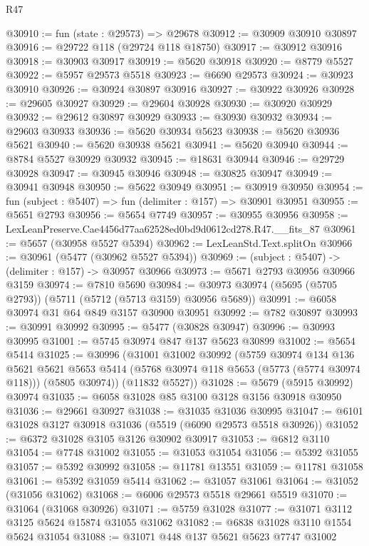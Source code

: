 \begin{lexlean}{R47}
\begin{coremodule}
@30910 := fun (state : @29573) => @29678
@30912 := @30909 @30910 @30897
@30916 := @29722 @118 (@29724 @118 @18750)
@30917 := @30912 @30916
@30918 := @30903 @30917
@30919 := @5620 @30918
@30920 := @8779 @5527
@30922 := @5957 @29573 @5518
@30923 := @6690 @29573
@30924 := @30923 @30910
@30926 := @30924 @30897 @30916
@30927 := @30922 @30926
@30928 := @29605 @30927
@30929 := @29604 @30928
@30930 := @30920 @30929
@30932 := @29612 @30897 @30929
@30933 := @30930 @30932
@30934 := @29603 @30933
@30936 := @5620 @30934 @5623
@30938 := @5620 @30936 @5621
@30940 := @5620 @30938 @5621
@30941 := @5620 @30940
@30944 := @8784 @5527 @30929 @30932
@30945 := @18631 @30944
@30946 := @29729 @30928
@30947 := @30945 @30946
@30948 := @30825 @30947
@30949 := @30941 @30948
@30950 := @5622 @30949
@30951 := @30919 @30950
@30954 := fun (subject : @5407) => fun (delimiter : @157) => @30901 @30951
@30955 := @5651 @2793
@30956 := @5654 @7749
@30957 := @30955 @30956
@30958 := LexLeanPreserve.Cae4456d77aa62528ed0bd9d0612cd278.R47.__fits_87
@30961 := @5657 (@30958 @5527 @5394)
@30962 := LexLeanStd.Text.splitOn
@30966 := @30961 (@5477 (@30962 @5527 @5394))
@30969 := (subject : @5407) -> (delimiter : @157) -> @30957 @30966
@30973 := @5671 @2793 @30956 @30966 @3159
@30974 := @7810 @5690
@30984 := @30973 @30974 (@5695 (@5705 @2793)) (@5711 (@5712 (@5713 @3159) @30956 @5689))
@30991 := @6058 @30974 @31 @64 @849 @3157 @30900 @30951
@30992 := @782 @30897
@30993 := @30991 @30992
@30995 := @5477 (@30828 @30947)
@30996 := @30993 @30995
@31001 := @5745 @30974 @847 @137 @5623 @30899
@31002 := @5654 @5414
@31025 := @30996
    (@31001
      @31002
      @30992
      (@5759
        @30974
        @134
        @136
        @5621
        @5621
        @5653
        @5414
        (@5768 @30974 @118 @5653 (@5773 (@5774 @30974 @118)))
        (@5805 @30974))
      (@11832 @5527))
@31028 := @5679 (@5915 @30992) @30974
@31035 := @6058 @31028 @85 @3100 @3128 @3156 @30918 @30950
@31036 := @29661 @30927
@31038 := @31035 @31036 @30995
@31047 := @6101 @31028 @3127 @30918 @31036 (@5519 (@6090 @29573 @5518 @30926))
@31052 := @6372 @31028 @3105 @3126 @30902 @30917
@31053 := @6812 @3110
@31054 := @7748 @31002
@31055 := @31053 @31054
@31056 := @5392 @31055
@31057 := @5392 @30992
@31058 := @11781 @13551
@31059 := @11781 @31058
@31061 := @5392 @31059 @5414
@31062 := @31057 @31061
@31064 := @31052 (@31056 @31062)
@31068 := @6006 @29573 @5518 @29661 @5519
@31070 := @31064 (@31068 @30926)
@31071 := @5759 @31028
@31077 := @31071 @3112 @3125 @5624 @15874 @31055 @31062
@31082 := @6838 @31028 @3110 @1554 @5624 @31054
@31088 := @31071 @448 @137 @5621 @5623 @7747 @31002

\end{coremodule}
\end{lexlean}
